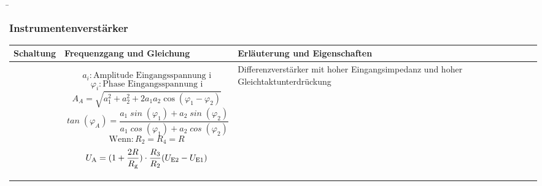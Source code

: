 \begin{frame}
    \b{
        \frametitle{Instrumentenverstärker}
    \centering
    \begin{table}[ht]
    \label{tab:Instrumentenverstaerker}
    \begin{tabular}{|m{}|m{}|m{}|}
    \hline
    Schaltung & Frequenzgang und Gleichung & Erläuterung und Eigenschaften\\ %
    \hline
    \vspace{0.5cm}
    \centering
    
     &
         \begin{center}
   
\end{center}

\vspace{1ex}
\[
\mathit{a_i} : \text{Amplitude Eingangsspannung i}
\]
\[
\mathit{\varphi_i} : \text{Phase Eingangsspannung i}
\]
\[
\mathit{A}_{A} = \sqrt{a_1^2 + a_2^2 + 2a_1a_2 \cos(\varphi_1 - \varphi_2)}
\]
\[
\mathit{\tan}(\varphi_A) = \frac{a_1 \mathit{\sin}(\varphi_1) + a_2 \mathit{\sin}(\varphi_2)}{a_1 \mathit{\cos}(\varphi_1) + a_2 \mathit{\cos}(\varphi_2)}
\]
\[
    \text{Wenn} : R_2 = R_4 = R
\]
\[
    U_{\textnormal{A}} = (1+ \frac{2R} {R_{\textnormal{g}}}) \cdot \frac{R_3} {R_2} (U_{\textnormal{E2}}-U_{\textnormal{E1}})
\]
     & 
    Differenzverstärker mit hoher Eingangsimpedanz und hoher Gleichtaktunterdrückung  
 \\
    \hline
    \end{tabular}
    \end{table}
    }
\end{frame}

